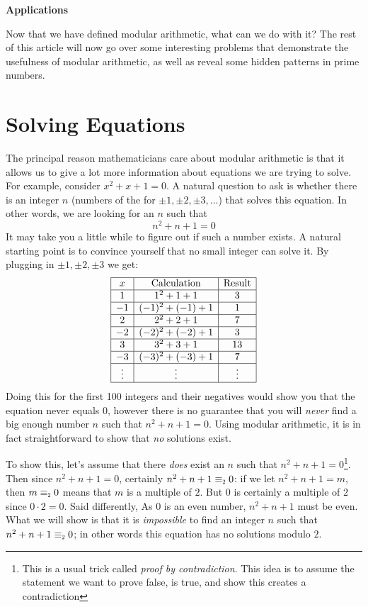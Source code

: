 \documentclass{article}
\newcommand{\chapter}[1]{%
  \clearpage
  \vspace*{30pt} %
  {\normalfont\huge\bfseries #1\par} %
  \vspace{20pt} %
}
\newcommand\scalemath[2]{\scalebox{#1}{\mbox{\ensuremath{\displaystyle #2}}}}
\newcommand{\Equiv}[1]{\equiv_{\scalemath{0.6}{#1}}}
\begin{document}
\newpage
\chapter{Applications}

Now that we have defined modular arithmetic, what can we do with it? The rest of this article will now go
over some interesting problems that demonstrate the usefulness of modular arithmetic, as well as reveal some
hidden patterns in prime numbers.

\section{Solving Equations}


The principal reason mathematicians care about modular arithmetic is that it allows us to give a lot more
information about equations we are trying to solve. For example, consider $x^2+x+1=0$. A natural question to ask
is whether there is an integer $n$ (numbers of the for
$\pm1, \pm2, \pm3, ...$) that solves this equation. In other words, we are looking for an $n$ such that
\[
  n^2+n+1 =0
  \]
It may take you a little while to figure out if such a number exists. A natural starting
point is to convince yourself that no small integer can solve it. By plugging in
$\pm1, \pm2, \pm3$ we get:
\[
\begin{array}{|c|c|c|}
\hline
x & \text{Calculation} & \text{Result} \\
\hline
1 & 1^2 + 1 + 1 & 3 \\
\hline
-1 & (-1)^2 + (-1) + 1 & 1 \\
\hline
2 & 2^2 + 2 + 1 & 7 \\
\hline
-2 & (-2)^2 + (-2) + 1 & 3 \\
\hline
3 & 3^2 + 3 + 1 & 13 \\
\hline
-3 & (-3)^2 + (-3) + 1 & 7 \\
\hline
\vdots & \vdots & \vdots\\
\hline
\end{array}
\]
Doing this for the first 100 integers and their negatives would show you that the equation never equals $0$,
however there is no guarantee that you will \emph{never} find a big enough number $n$ such that $n^2+n+1=0$.
Using modular arithmetic, it is in fact straightforward to show that \emph{no} solutions exist.

To show this, let's assume that there \emph{does} exist an $n$ such that $n^2+n+1=0$\footnote{This is a usual
trick called \emph{proof by contradiction}. This idea is to assume the statement we want to prove false, is
true, and show this creates a contradiction}. Then since $n^2+n+1=0$, certainly $n^2+n+1\Equiv{2}0$: if we let
$n^2+n+1=m$, then $m\Equiv{2} 0$ means that $m$ is a multiple of $2$. But $0$ is certainly a multiple of $2$
since $0\cdot 2=  0$. Said differently, As $0$ is an even number, $n^2+n+1$ must be even. What we will show is that it is \emph{impossible} to find an integer $n$ such that
$n^2+n+1\Equiv{2}0$; in other words this equation has no solutions modulo $2$.
\end{document}

